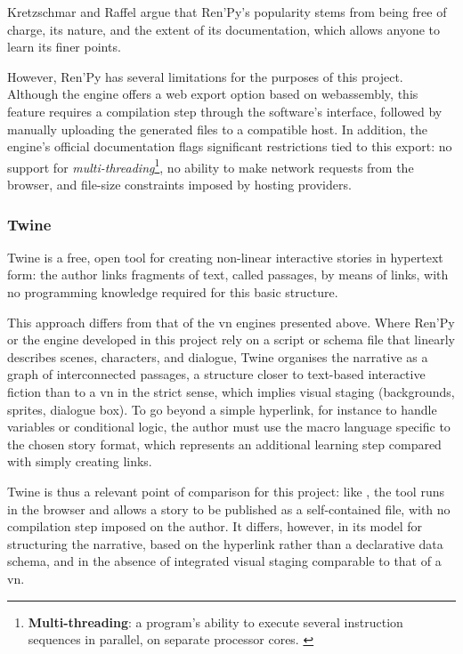 Kretzschmar and Raffel argue that Ren'Py's popularity stems from being free of charge, its  nature, and the extent of its documentation, which allows anyone to learn its finer points. \parencite{kretzschmar_history_2023}

However, Ren'Py has several limitations for the purposes of this project. Although the engine offers a web export option based on \gls{webassembly}, this feature requires a compilation step through the software's interface, followed by manually uploading the generated files to a compatible host. In addition, the engine's official documentation flags significant restrictions tied to this export: no support for \textit{multi-threading}\footnote{\textbf{Multi-threading}: a program's ability to execute several instruction sequences in parallel, on separate processor cores. \parencite{noauthor_javascript_2026}}, no ability to make network requests from the browser, and file-size constraints imposed by hosting providers. \parencite{noauthor_renpy_nodate}



\subsubsection{Twine}

Twine is a free, open tool for creating non-linear interactive stories in hypertext form: the author links fragments of text, called passages, by means of links, with no programming knowledge required for this basic structure. \parencite{klimas_introduction_nodate}

This approach differs from that of the \gls{vn} engines presented above. Where Ren'Py or the engine developed in this project rely on a script or \gls{schema} file that linearly describes scenes, characters, and dialogue, Twine organises the narrative as a graph of interconnected passages, a structure closer to text-based interactive fiction than to a \gls{vn} in the strict sense, which implies visual staging (backgrounds, \glspl{sprite}, dialogue box). To go beyond a simple hyperlink, for instance to handle variables or conditional logic, the author must use the macro language specific to the chosen story format, which represents an additional learning step compared with simply creating links. \parencite{klimas_introduction_nodate}

Twine is thus a relevant point of comparison for this project: like \nsit, the tool runs in the browser and allows a story to be published as a self-contained file, with no compilation step imposed on the author. It differs, however, in its model for structuring the narrative, based on the hyperlink rather than a declarative data \gls{schema}, and in the absence of integrated visual staging comparable to that of a \gls{vn}.

